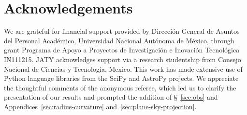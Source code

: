\documentclass[useAMS, usenatbib, a4paper]{mnras}
\begin{document}
\section*{Acknowledgements}

We are grateful for financial support provided by Dirección General de
Asuntos del Personal Académico, Universidad Nacional Autónoma de
México, through grant Programa de Apoyo a Proyectos de Investigación e
Inovación Tecnológica IN111215.  JATY acknowledges support via a
research studentship from Consejo Nacional de Ciencias y Tecnología,
Mexico.  This work has made extensive use of Python language libraries
from the SciPy \citep{Jones:2001a} and AstroPy
\citep{Astropy-Collaboration:2013a, Astropy-Collaboration:2018a}
projects.  We appreciate the thoughtful comments of the anonymous
referee, which led us to clarify the presentation of our results and
prompted the addition of \S~\ref{sec:obs} and
Appendices~\ref{sec:radius-curvature}
and~\ref{sec:plane-sky-projection}.
\end{document}
